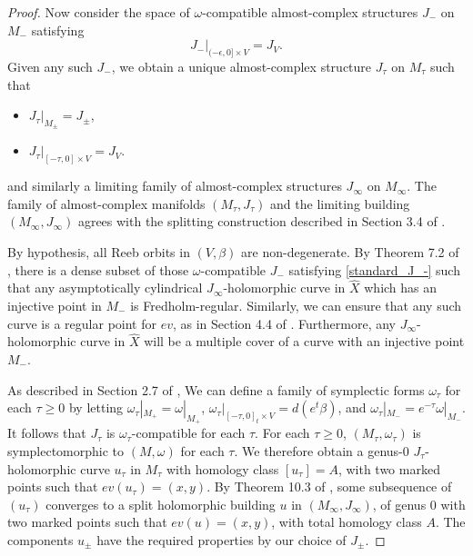 \documentclass{article}
\numberwithin{equation}{section}
\numberwithin{figure}{section}
\begin{document}
\begin{proof}
Now consider the space of $\omega$-compatible almost-complex structures $J_-$ on $M_-$ satisfying
\begin{equation}
J_-|_{(-\epsilon,0]\times V}=J_V.
\label{standard_J_-}
\end{equation}
Given any such $J_-$, we obtain a unique almost-complex structure $J_\tau$ on $M_\tau$ such that
\begin{itemize}
    \item $J_\tau|_{M_\pm}=J_\pm$,
    \item $J_\tau|_{[-\tau,0]\times V}=J_V$.
\end{itemize}
and similarly a limiting family of almost-complex structures $J_\infty$ on $M_\infty$. The family of almost-complex manifolds $(M_\tau,J_\tau)$ and the limiting building $(M_\infty,J_\infty)$ agrees with the splitting construction described in Section 3.4 of \cite{Bou}. 

By hypothesis, all Reeb orbits in $(V,\beta)$ are non-degenerate. By Theorem 7.2 of \cite{Wendl}, there is a dense subset of those $\omega$-compatible $J_-$ satisfying \eqref{standard_J_-} such that any asymptotically cylindrical $J_\infty$-holomorphic curve in $\hat{X}$ which has an injective point in $M_-$ is Fredholm-regular. Similarly, we can ensure that any such curve is a regular point for $ev$, as in Section 4.4 of \cite{Wendl2}. Furthermore, any $J_\infty$-holomorphic curve in $\hat{X}$ will be a multiple cover of a curve with an injective point $M_-$.

As described in Section 2.7 of \cite{CM}, We can define a family of symplectic forms $\omega_\tau$ for each $\tau\geq 0$ by letting $\omega_\tau|_{M_+}=\omega|_{M_+}$, $\omega_\tau|_{[-\tau,0]_t\times V}=d(e^t\beta)$, and $\omega_\tau|_{M_-}=e^{-\tau}\omega|_{M_-}$. It follows that $J_\tau$ is $\omega_\tau$-compatible for each $\tau$. For each $\tau\geq 0$, $(M_\tau,\omega_\tau)$ is symplectomorphic to $(M,\omega)$ for each $\tau$. We therefore obtain a genus-$0$ $J_\tau$-holomorphic curve $u_\tau$ in $M_\tau$ with homology class $[u_\tau]=A$, with two marked points such that $ev(u_\tau)=(x,y)$. By Theorem 10.3 of \cite{Bou}, some subsequence of $(u_\tau)$ converges to a split holomorphic building $u$ in $(M_\infty,J_\infty)$, of genus $0$ with two marked points such that $ev(u)=(x,y)$, with total homology class $A$. The components $u_\pm$ have the required properties by our choice of $J_\pm$.
\end{proof}
\end{document}

